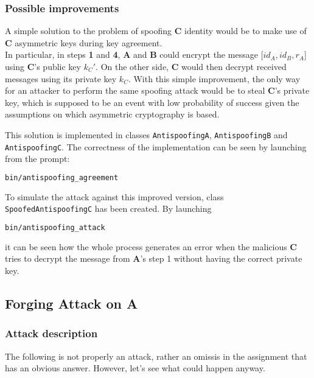 \documentclass[a4paper,12pt,titlepage]{article}
\begin{document}
\subsubsection*{Possible improvements}
A simple solution to the problem of spoofing \textbf{C} identity would be to make
use of \textbf{C} asymmetric keys during key agreement. \\
In particular, in steps \textbf{1} and \textbf{4}, \textbf{A} and \textbf{B} could encrypt the
message $[id_A, id_B, r_A$] using \textbf{C}'s public key
$k_C'$. On the other side, \textbf{C} would then decrypt received messages
using its private key $k_C$. With this simple improvement, the only
way for an attacker to perform the same spoofing attack would be to steal
\textbf{C}'s private key, which is supposed to be an event with low probability of
success given the assumptions on which  asymmetric cryptography is based.

This solution is implemented in classes \texttt{AntispoofingA}, \texttt{AntispoofingB} and
\texttt{AntispoofingC}. The correctness of the implementation can be seen by launching
from the prompt:

\begin{lstlisting}[language=bash]
bin/antispoofing_agreement
\end{lstlisting}

To simulate the attack against this improved version, class
\texttt{SpoofedAntispoofingC} has been created. By launching

\begin{lstlisting}[language=bash]
bin/antispoofing_attack
\end{lstlisting}

it can be seen how the whole process generates an error when the malicious
\textbf{C} tries to decrypt the message from \textbf{A}'s step 1 without having the
correct private key.


\subsection{Forging Attack on A}
\subsubsection*{Attack description}
The following is not properly an attack, rather an omissis in the assignment
that has an obvious answer. However, let's see what could happen anyway.
\end{document}
